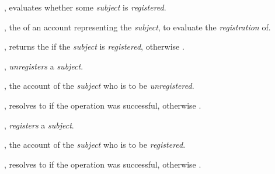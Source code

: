 \begin{interface}
  \item \specification{}

  \begin{functions}
    \item {}, evaluates whether some
      \emph{subject} is \emph{registered}.

      \begin{parameters}
        \item {}, the  of an account
          representing the \emph{subject}, to evaluate the \emph{registration}
          of.
      \end{parameters}

      \begin{returns}
        \item {}, returns the  if the
          \emph{subject} is \emph{registered}, otherwise .
      \end{returns}

    \item {}, \emph{unregisters} a
      \emph{subject}.

      \begin{parameters}
        \item {}, the account  of the
          \emph{subject} who is to be \emph{unregistered}.
      \end{parameters}

      \begin{returns}
        \item {}, resolves to  if the operation was
          successful, otherwise .
      \end{returns}

    \item {}, \emph{registers} a
      \emph{subject}.

      \begin{parameters}
        \item {}, the account  of the
          \emph{subject} who is to be \emph{registered}.
      \end{parameters}

      \begin{returns}
        \item {}, resolves to  if the operation was
          successful, otherwise .
      \end{returns}
  \end{functions}
\end{interface}
